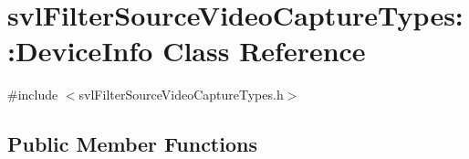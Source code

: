 \hypertarget{classsvl_filter_source_video_capture_types_1_1_device_info}{\section{svl\-Filter\-Source\-Video\-Capture\-Types\-:\-:Device\-Info Class Reference}
\label{classsvl_filter_source_video_capture_types_1_1_device_info}
}


{\ttfamily \#include $<$svl\-Filter\-Source\-Video\-Capture\-Types.\-h$>$}

\subsection*{Public Member Functions}
